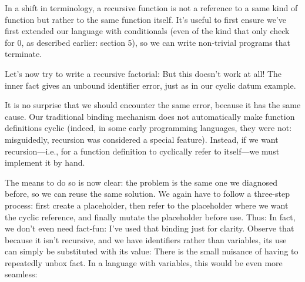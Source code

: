 
In a shift in terminology, a recursive function is not a reference to a same
kind of function but rather to the same function itself. It’s useful to first
ensure we’ve first extended our language with conditionals (even of the kind
that only check for 0, as described earlier: section 5), so we can write
non-trivial programs that terminate.

Let’s now try to write a recursive factorial:
But this doesn’t work at all! The inner fact gives an unbound identifier error,
just as in our cyclic datum example.

It is no surprise that we should encounter the same error, because it has the
same cause. Our traditional binding mechanism does not automatically make
function definitions cyclic (indeed, in some early programming languages, they
were not: misguidedly, recursion was considered a special feature). Instead, if
we want recursion—i.e., for a function definition to cyclically refer to
itself—we must implement it by hand.

The means to do so is now clear: the problem is the same one we diagnosed
before, so we can reuse the same solution. We again have to follow a three-step
process: first create a placeholder, then refer to the placeholder where we want
the cyclic reference, and finally mutate the placeholder before use. Thus:
In fact, we don’t even need fact-fun: I’ve used that binding just for clarity.
Observe that because it isn’t recursive, and we have identifiers rather than
variables, its use can simply be substituted with its value:
There is the small nuisance of having to repeatedly unbox fact. In a language
with variables, this would be even more seamless:
